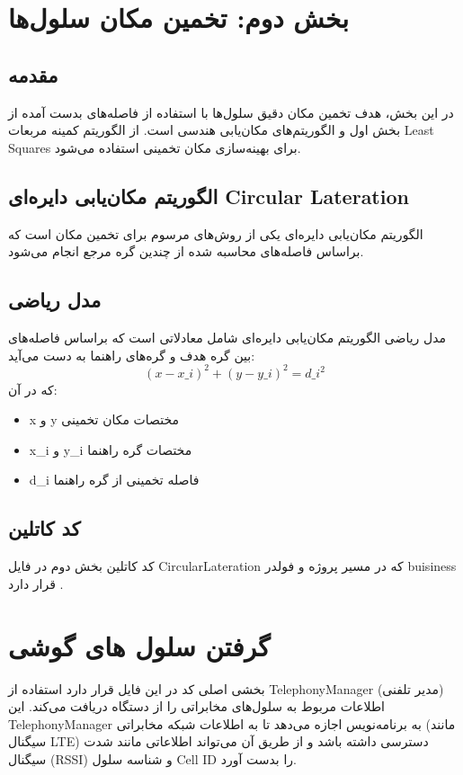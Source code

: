 \documentclass[11pt]{article}
\begin{document}
\section{بخش دوم: تخمین مکان سلول‌ها}

\subsection{مقدمه}
در این بخش، هدف تخمین مکان دقیق سلول‌ها با استفاده از فاصله‌های بدست آمده از بخش اول و الگوریتم‌های مکان‌یابی هندسی است. از الگوریتم کمینه مربعات Least Squares برای بهینه‌سازی مکان تخمینی استفاده می‌شود.

\subsection{الگوریتم مکان‌یابی دایره‌ای Circular Lateration}
الگوریتم مکان‌یابی دایره‌ای یکی از روش‌های مرسوم برای تخمین مکان است که براساس فاصله‌های محاسبه شده از چندین گره مرجع انجام می‌شود.

\subsection{مدل ریاضی}
مدل ریاضی الگوریتم مکان‌یابی دایره‌ای شامل معادلاتی است که براساس فاصله‌های بین گره هدف و گره‌های راهنما به دست می‌آید:
\[
(x - x\_i)^2 + (y - y\_i)^2 = d\_i^2
\]
که در آن:
\begin{itemize}
    \item x و  y مختصات مکان تخمینی
    \item x\_i و  y\_i مختصات گره راهنما
    \item d\_i فاصله تخمینی از گره راهنما
\end{itemize}

\subsection{کد کاتلین}
کد کاتلین بخش دوم در فایل CircularLateration که در مسیر پروژه و فولدر buisiness قرار دارد .

\section{گرفتن سلول های گوشی }

بخشی اصلی کد در این فایل قرار دارد استفاده از TelephonyManager (مدیر تلفنی) اطلاعات مربوط به سلول‌های مخابراتی را از دستگاه دریافت می‌کند. این TelephonyManager به برنامه‌نویس اجازه می‌دهد تا به اطلاعات شبکه مخابراتی (مانند سیگنال LTE) دسترسی داشته باشد و از طریق آن می‌تواند اطلاعاتی مانند شدت سیگنال (RSSI) و شناسه سلول Cell ID را بدست آورد.
\end{document}
